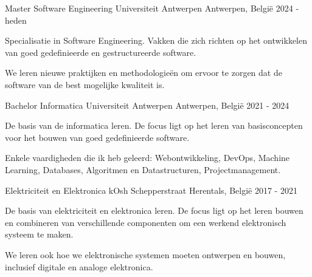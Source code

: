 
\begin{cventries}

  \cventry
    {Master Software Engineering} %
    {Universiteit Antwerpen} %
    {Antwerpen, België} %
    {2024 - heden} %
    {
      \begin{cvitems} %
        \item {Specialisatie in Software Engineering. Vakken die zich richten op het ontwikkelen van goed gedefinieerde en gestructureerde software.}
        \item {We leren nieuwe praktijken en methodologieën om ervoor te zorgen dat de software van de best mogelijke kwaliteit is.}
      \end{cvitems}
    }

  \cventry
    {Bachelor Informatica} %
    {Universiteit Antwerpen} %
    {Antwerpen, België} %
    {2021 - 2024} %
    {
      \begin{cvitems} %
        \item {De basis van de informatica leren. De focus ligt op het leren van basisconcepten voor het bouwen van goed gedefinieerde software.}
        \item {Enkele vaardigheden die ik heb geleerd: Webontwikkeling, DevOps, Machine Learning, Databases, Algoritmen en Datastructuren, Projectmanagement.}
      \end{cvitems}
    }

  \cventry
    {Elektriciteit en Elektronica} %
    {kOsh Schepperstraat} %
    {Herentals, België} %
    {2017 - 2021} %
    {
      \begin{cvitems} %
        \item {De basis van elektriciteit en elektronica leren. De focus ligt op het leren bouwen en combineren van verschillende componenten om een werkend elektronisch systeem te maken.}
        \item {We leren ook hoe we elektronische systemen moeten ontwerpen en bouwen, inclusief digitale en analoge elektronica.}
      \end{cvitems}
    }
\end{cventries}
